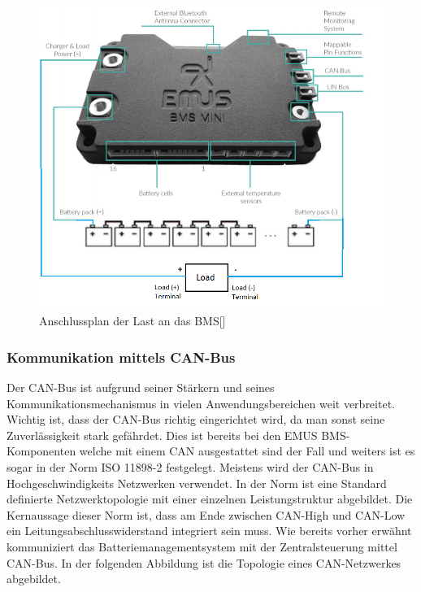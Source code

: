 \begin{figure}[H]
	\begin{center}
		\includegraphics[scale=0.7]{figures/Akku/SystemStrukturBMSLast.png}
		\caption{Anschlussplan der Last an das BMS[\cite{AnschlussplanLast}]}
		\label{fig: Anschlussplan der Last an das BMS}
	\end{center}
\end{figure}
\newpage

\subsubsection{Kommunikation mittels CAN-Bus}

Der CAN-Bus ist aufgrund seiner Stärkern und seines Kommunikationsmechanismus in vielen Anwendungsbereichen weit verbreitet. Wichtig ist, dass der CAN-Bus richtig eingerichtet wird, da man sonst seine Zuverlässigkeit stark gefährdet. Dies ist bereits bei den EMUS BMS-Komponenten welche mit einem CAN ausgestattet sind der Fall und weiters ist es sogar in der Norm ISO 11898-2 festgelegt. Meistens wird der CAN-Bus in Hochgeschwindigkeits Netzwerken verwendet. In der Norm ist eine Standard definierte Netzwerktopologie mit einer einzelnen Leistungstruktur abgebildet. Die Kernaussage dieser Norm ist, dass am Ende zwischen CAN-High und CAN-Low ein Leitungsabschlusswiderstand integriert sein muss. Wie bereits vorher erwähnt kommuniziert das Batteriemanagementsystem mit der Zentralsteuerung mittel CAN-Bus. In der folgenden Abbildung ist die Topologie eines CAN-Netzwerkes abgebildet.

